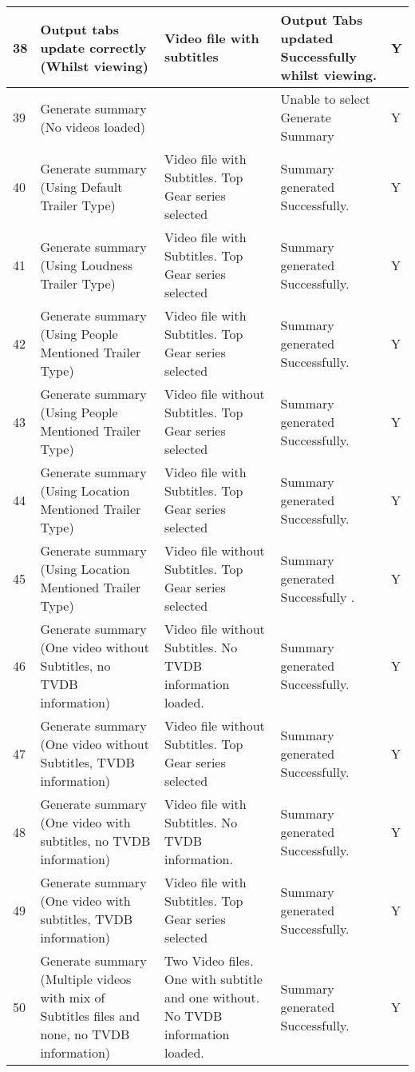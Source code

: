 \begin{center}
\begin{longtable}{| p{18pt} | p{100pt}| p{100pt}| p{110pt} | p{46pt} |}
\\\hline						
38	&Output tabs update correctly (Whilst viewing)						&Video file with subtitles	&Output Tabs updated Successfully whilst viewing.	&Y				
\\\hline	
39	&Generate summary (No videos loaded)								&					&Unable to select Generate Summary			&Y				
\\\hline	
40	&Generate summary (Using Default Trailer Type)						&Video file with Subtitles. Top Gear series selected		&Summary generated Successfully.	&Y		
\\\hline	
41	&Generate summary (Using Loudness Trailer Type)						&Video file with Subtitles. Top Gear series selected		&Summary generated Successfully.	&Y		
\\\hline	
42	&Generate summary (Using People Mentioned Trailer Type)				&Video file with Subtitles. Top Gear series selected		&Summary generated Successfully.	&Y		
\\\hline	
43	&Generate summary (Using People Mentioned Trailer Type)				&Video file without Subtitles. Top Gear series selected	&Summary generated Successfully.	&Y		
\\\hline	
44	&Generate summary (Using Location Mentioned Trailer Type)				&Video file with Subtitles. Top Gear series selected		&Summary generated Successfully.	&Y		
\\\hline	
45	&Generate summary (Using Location Mentioned Trailer Type)				&Video file without Subtitles. Top Gear series selected	&Summary generated Successfully	.	&Y			
\\\hline						
46	&Generate summary (One video without Subtitles, no TVDB information)		&Video file without Subtitles. No TVDB information loaded. &Summary generated Successfully.	&Y	
\\\hline	
47	&Generate summary (One video without Subtitles, TVDB information)		&Video file without Subtitles. Top Gear series selected	&Summary generated Successfully.	&Y
\\\hline	
48	&Generate summary (One video with subtitles, no TVDB information)			&Video file with Subtitles. No TVDB information.		&Summary generated Successfully.	&Y
\\\hline	
49	&Generate summary (One video with subtitles, TVDB information)			&Video file with Subtitles. Top Gear series selected		&Summary generated Successfully.	&Y	
\\\hline						
50	&Generate summary (Multiple videos with mix of Subtitles files and none, no TVDB information)	&Two Video files. One with subtitle and one without. No TVDB information loaded.	&Summary generated Successfully.	&Y	

\end{longtable}
\end{center}
